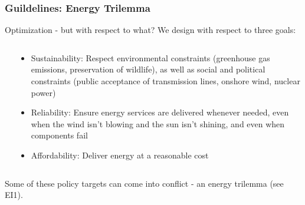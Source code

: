 \documentclass[10pt,aspectratio=169,dvipsnames]{beamer}
\let\olditem\item
\renewcommand{\item}{%
\olditem\vspace{5pt}}
\begin{document}
\begin{frame}
  \frametitle{Guildelines: Energy Trilemma}

  Optimization - but with respect to what? We design with respect to three goals:

\begin{columns}[T]

  \begin{column}{5.5cm}


  \vspace{1cm}


  \end{column}


  \begin{column}{8cm}
\begin{itemize}
  \item \alert{Sustainability}: Respect environmental constraints (greenhouse gas emissions, preservation of wildlife), as well as social and political constraints (public acceptance of transmission lines, onshore wind, nuclear power)
  \item \alert{Reliability}: Ensure energy services are delivered whenever needed, even when the wind isn't blowing and the sun isn't shining, and even when components fail
  \item \alert{Affordability}: Deliver energy at a reasonable cost
  \end{itemize}

  \end{column}
\end{columns}


  \vspace{.3cm}

  Some of these policy targets can come into \alert{conflict} - an \alert{energy trilemma} (see EI1).

\end{frame}
\end{document}
